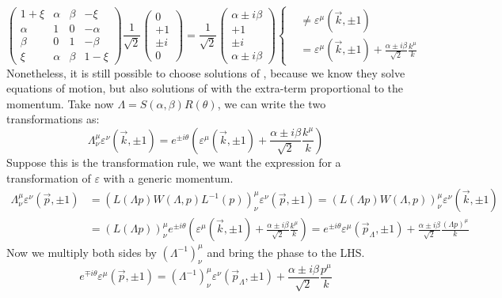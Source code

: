 \documentclass[../main.tex]{subfiles}
\begin{document}
\[
\left(\begin{array}{cccc}
    1+\xi & \alpha & \beta & -\xi \\
    \alpha & 1 & 0 & -\alpha \\
    \beta & 0 & 1 & -\beta \\
    \xi & \alpha & \beta & 1-\xi
\end{array}\right)\frac{1}{\sqrt{2}}\left(\begin{array}{c}
    0 \\
    +1 \\
    \pm i \\
    0
\end{array}\right)=\frac{1}{\sqrt{2}}\left(\begin{array}{c}
    \alpha\pm i\beta \\
    +1 \\
    \pm i \\
    \alpha\pm i\beta
\end{array}\right)\left\{
\begin{aligned}
&\neq\varepsilon^\mu(\vec{k},\pm1)\\
&=\varepsilon^\mu(\vec{k},\pm1)+\frac{\alpha\pm i\beta}{\sqrt{2}}\frac{k^\mu}{k}
\end{aligned}
\right.
\]
Nonetheless, it is still possible to choose solutions of , because we know they solve equations of motion, but also solutions of  with the extra-term proportional to the momentum. Take now $\Lambda=S(\alpha,\beta)R(\theta)$, we can write the two transformations as:
\[
\Lambda^\mu_\nu\varepsilon^\nu(\vec{k},\pm1)=e^{\pm i\theta}\left(\varepsilon^\mu(\vec{k},\pm1)+\frac{\alpha\pm i\beta}{\sqrt{2}}\frac{k^\mu}{k}\right)
\]
Suppose this is the transformation rule, we want the expression for a transformation of $\varepsilon$ with a generic momentum.
\begin{align*}
\Lambda^\mu_\nu\varepsilon^\nu(\vec{p},\pm1)&=\left(L(\Lambda p)W(\Lambda,p)L^{-1}(p)\right)^\mu_\nu\varepsilon^\nu(\vec{p},\pm1)=\left(L(\Lambda p)W(\Lambda,p)\right)^\mu_\nu\varepsilon^\nu(\vec{k},\pm1)\\
&=(L(\Lambda p))^\mu_\nu e^{\pm i\theta}\left(\varepsilon^\mu(\vec{k},\pm1)+\frac{\alpha\pm i\beta}{\sqrt{2}}\frac{k^\mu}{k}\right)=e^{\pm i\theta}\varepsilon^\mu(\vec{p}_\Lambda,\pm1)+\frac{\alpha\pm i\beta}{\sqrt{2}}\frac{(\Lambda p)^\mu}{k}
\end{align*}
Now we multiply both sides by $(\Lambda^{-1})^\mu_\nu$ and bring the phase to the LHS.
\[
e^{\mp i\theta}\varepsilon^\mu(\vec{p},\pm1)=(\Lambda^{-1})^\mu_\nu\varepsilon^\nu(\vec{p}_\Lambda,\pm1)+\frac{\alpha\pm i\beta}{\sqrt{2}}\frac{p^\mu}{k}
\]
\end{document}
